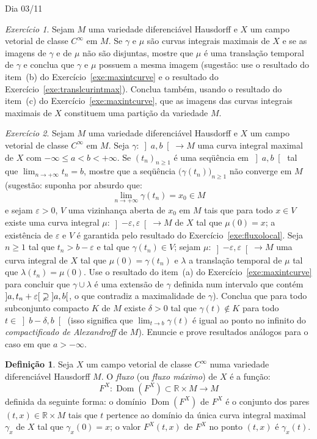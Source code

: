 \documentclass[oneside,11pt]{amsart}
\newcommand{\R}{\mathds R}
\DeclareMathOperator{\Dom}{Dom}
\theoremstyle{remark}\newtheorem{exercise}{Exercício}[section]
\theoremstyle{plain}\newtheorem{teo}{Teorema}[section]
\theoremstyle{plain}\newtheorem{lem}[teo]{Lema}
\theoremstyle{plain}\newtheorem{prop}[teo]{Proposição}
\theoremstyle{definition}\newtheorem{defin}[teo]{Definição}
\theoremstyle{remark}\newtheorem{rem}[teo]{Observação}
\theoremstyle{definition}\newtheorem{example}[teo]{Exemplo}
\numberwithin{equation}{section}
\begin{document}
\begin{section}{Dia 03/11}
\begin{exercise}
Sejam $M$ uma variedade diferenciável Hausdorff e $X$ um campo vetorial de classe $C^\infty$ em $M$. Se $\gamma$ e $\mu$ são curvas integrais
maximais de $X$ e se as imagens de $\gamma$ e de $\mu$ não são disjuntas, mostre que $\mu$ é uma translação temporal de $\gamma$ e conclua
que $\gamma$ e $\mu$ possuem a mesma imagem (sugestão: use o resultado do item~(b) do Exercício~\ref{exe:maxintcurve} e o resultado
do Exercício~\ref{exe:translcurintmax}). Conclua também, usando o resultado do item~(c) do Exercício~\ref{exe:maxintcurve}, que as imagens das curvas
integrais maximais de $X$ constituem uma partição da variedade $M$.
\end{exercise}

\begin{exercise}
Sejam $M$ uma variedade diferenciável Hausdorff e $X$ um campo vetorial de classe $C^\infty$ em $M$. Seja $\gamma:\left]a,b\right[\to M$ uma curva
integral maximal de $X$ com $-\infty\le a<b<+\infty$. Se $(t_n)_{n\ge1}$ é uma seqüência em $\left]a,b\right[$ tal que $\lim_{n\to+\infty}t_n=b$,
mostre que a seqüência $\big(\gamma(t_n)\big)_{n\ge1}$ não converge em $M$ (sugestão: suponha por absurdo que:
\[\lim_{n\to+\infty}\gamma(t_n)=x_0\in M\]
e sejam $\varepsilon>0$, $V$ uma vizinhança aberta de $x_0$ em $M$ tais que para todo $x\in V$ existe uma curva integral
$\mu:\left]-\varepsilon,\varepsilon\right[\to M$
de $X$ tal que $\mu(0)=x$; a existência de $\varepsilon$ e $V$ é garantida pelo resultado do Exercício~\ref{exe:fluxolocal}. Seja $n\ge1$ tal que
$t_n>b-\varepsilon$ e tal que $\gamma(t_n)\in V$; sejam $\mu:\left]-\varepsilon,\varepsilon\right[\to M$ uma curva integral de $X$ tal que
$\mu(0)=\gamma(t_n)$ e $\lambda$ a translação temporal de $\mu$ tal que $\lambda(t_n)=\mu(0)$. Use o resultado do item~(a)
do Exercício~\ref{exe:maxintcurve} para concluir que $\gamma\cup\lambda$ é uma extensão
de $\gamma$ definida num intervalo que contém
$\left]a,t_n+\varepsilon\right[\varsupsetneq\left]a,b\right[$, o que contradiz
a maximalidade de $\gamma$).
Conclua que para todo subconjunto compacto $K$ de $M$ existe $\delta>0$ tal que $\gamma(t)\not\in K$ para todo $t\in\left]b-\delta,b\right[$ (isso
significa que $\lim_{t\to b}\gamma(t)$ é igual ao ponto no infinito do {\em compactificado de Alexandroff\/} de $M$).
Enuncie e prove resultados análogos para o caso em que $a>-\infty$.
\end{exercise}

\begin{defin}
Seja $X$ um campo vetorial de classe $C^\infty$ numa variedade diferenciável Hausdorff $M$. O {\em fluxo\/} (ou {\em fluxo máximo}) de $X$ é a função:
\[F^X:\Dom(F^X)\subset\R\times M\longrightarrow M\]
definida da seguinte forma: o domínio $\Dom(F^X)$ de $F^X$ é o conjunto dos pares $(t,x)\in\R\times M$ tais que $t$ pertence ao domínio da única curva integral
maximal $\gamma_x$ de $X$ tal que $\gamma_x(0)=x$; o valor $F^X(t,x)$ de $F^X$ no ponto $(t,x)$ é $\gamma_x(t)$.
\end{defin}


\end{section}
\end{document}
